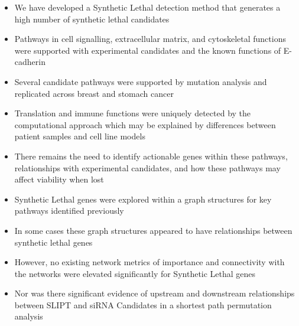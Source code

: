    \begin{itemize}
   \item We have developed a Synthetic Lethal detection method that generates a high number of synthetic lethal candidates
   
   \bigskip
   
   \item Pathways in cell signalling, extracellular matrix, and cytoskeletal functions were supported with experimental candidates and the known functions of E-cadherin
   
   \bigskip
   
   \item Several candidate pathways were supported by mutation analysis and replicated across breast and stomach cancer
   
   \bigskip
   
   \item Translation and immune functions were uniquely detected by the computational approach which may be explained by differences between patient samples and cell line models
   
   \bigskip
   
   \item There remains the need to identify actionable genes within these pathways, relationships with experimental candidates, and how these pathways may affect viability when lost
  \end{itemize}
  
    \begin{itemize}
   \item Synthetic Lethal genes were explored within a graph structures for key pathways identified previously 
   
   \bigskip
   
   \item In some cases these graph structures appeared to have relationships between synthetic lethal genes  
   
   \bigskip
   
   \item However, no existing network metrics of importance and connectivity with the networks were elevated significantly for Synthetic Lethal genes
   
   \bigskip
   
   \item Nor was there significant evidence of upstream and downstream relationships between SLIPT and \gls{siRNA} Candidates in a shortest path permutation analysis
  \end{itemize}
  
